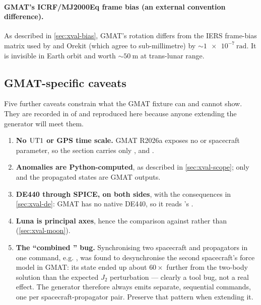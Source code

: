 \paragraph{GMAT's ICRF/MJ2000Eq frame bias (an external convention
difference).} As described in \cref{sec:xval-bias}, GMAT's rotation differs
from the IERS frame-bias matrix used by \lupnt{} and Orekit (which agree to
sub-millimetre) by ${\sim}\SI{1e-7}{\radian}$. It is invisible in Earth orbit
and worth ${\sim}\SI{50}{\meter}$ at trans-lunar range.

\subsection{GMAT-specific caveats}
\label{sec:xval-gmat-caveats}

Five further caveats constrain what the GMAT fixture can and cannot show.
They are recorded in  of
 and reproduced here because
anyone extending the generator will meet them.

\begin{enumerate}[leftmargin=1.6em]
  \item \textbf{No $\mathrm{UT1}$ or GPS time scale.} GMAT R2026a exposes no
     or  spacecraft parameter, so the
     section carries only ,
     and .
  \item \textbf{Anomalies are Python-computed}, as described in
    \cref{sec:xval-scope}; only  and the propagated states are
    GMAT outputs.
  \item \textbf{DE440 through SPICE, on both sides}, with the consequences in
    \cref{sec:xval-de}: GMAT has no native DE440, so it reads \lupnt{}'s
    .
  \item \textbf{Luna  is principal axes}, hence the comparison
    against  rather than 
    (\cref{sec:xval-moon}).
  \item \textbf{The ``combined '' bug.} Synchronising two
    spacecraft and propagators in one command, e.g.
    , was
    found to desynchronise the second spacecraft's force model in GMAT:
    its state ended up about $60\times$ further from the two-body solution
    than the expected $J_2$ perturbation --- clearly a tool bug, not a real
    effect. The generator therefore always emits separate, sequential
     commands, one
    per spacecraft-propagator pair. Preserve that pattern when extending it.
\end{enumerate}

